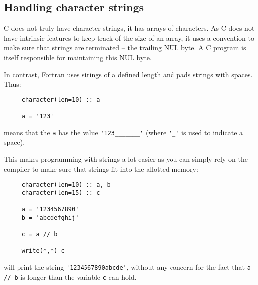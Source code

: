 \subsection{Handling character strings}
C does not truly have character strings, it has arrays of characters. As C does not have intrinsic
features to keep track of the size of an array, it uses a convention to make sure that strings
are terminated -- the trailing NUL byte. A C program is itself responsible for maintaining this
NUL byte.

In contrast, Fortran uses strings of a defined length and pads strings with spaces. Thus:
\begin{verbatim}
     character(len=10) :: a

     a = '123'
\end{verbatim}

\noindent means that the \verb+a+ has the value \verb+'123_______'+ (where \verb+'_'+ is used to indicate a space).

This makes programming with strings a lot easier as you can simply rely on the compiler to make
sure that strings fit into the allotted memory:

\begin{verbatim}
     character(len=10) :: a, b
     character(len=15) :: c

     a = '1234567890'
     b = 'abcdefghij'

     c = a // b

     write(*,*) c
\end{verbatim}

\noindent will print the string \verb+'1234567890abcde'+, without any concern for the fact that \verb+a // b+
is longer than the variable \verb+c+ can hold.
